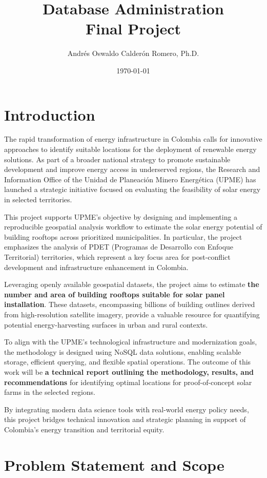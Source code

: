 \documentclass[12pt]{article}
\title{Database Administration \\ Final Project}
\author{Andrés Oswaldo Calderón Romero, Ph.D.}
\date{\today}
\begin{document}
\maketitle

\section{Introduction}

The rapid transformation of energy infrastructure in Colombia calls for innovative approaches to identify suitable locations for the deployment of renewable energy solutions. As part of a broader national strategy to promote sustainable development and improve energy access in underserved regions, the Research and Information Office of the Unidad de Planeación Minero Energética (UPME) has launched a strategic initiative focused on evaluating the feasibility of solar energy in selected territories.

This project supports UPME’s objective by designing and implementing a reproducible geospatial analysis workflow to estimate the solar energy potential of building rooftops across prioritized municipalities. In particular, the project emphasizes the analysis of PDET (Programas de Desarrollo con Enfoque Territorial) territories, which represent a key focus area for post-conflict development and infrastructure enhancement in Colombia.

Leveraging openly available geospatial datasets, the project aims to estimate \textbf{the number and area of building rooftops suitable for solar panel installation}. These datasets, encompassing billions of building outlines derived from high-resolution satellite imagery, provide a valuable resource for quantifying potential energy-harvesting surfaces in urban and rural contexts.

To align with the UPME’s technological infrastructure and modernization goals, the methodology is designed using NoSQL data solutions, enabling scalable storage, efficient querying, and flexible spatial operations. The outcome of this work will be \textbf{a technical report outlining the methodology, results, and recommendations} for identifying optimal locations for proof-of-concept solar farms in the selected regions.

By integrating modern data science tools with real-world energy policy needs, this project bridges technical innovation and strategic planning in support of Colombia’s energy transition and territorial equity.

\section{Problem Statement and Scope}
\end{document}

